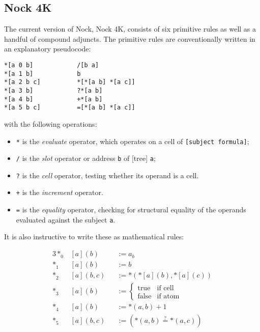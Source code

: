 \subsection{Nock 4K}

The current version of Nock, Nock 4K, consists of six primitive rules as well as a handful of compound adjuncts.  The primitive rules are conventionally written in an explanatory pseudocode:

\begin{lstlisting}[style=nonumbers]
*[a 0 b]            /[b a]
*[a 1 b]            b
*[a 2 b c]          *[*[a b] *[a c]]
*[a 3 b]            ?*[a b]
*[a 4 b]            +*[a b]
*[a 5 b c]          =[*[a b] *[a c]]
\end{lstlisting}

with the following operations:

\begin{itemize}
  \item  \texttt{*} is the \emph{evaluate} operator, which operates on a cell of \texttt{[subject formula]};
  \item  \texttt{/} is the \emph{slot} operator or address \texttt{b} of [tree] \texttt{a};
  \item  \texttt{?} is the \emph{cell} operator, testing whether its operand is a cell.
  \item  \texttt{+} is the \emph{increment} operator.
  \item  \texttt{=} is the \emph{equality} operator, checking for structural equality of the operands evaluated against the subject \texttt{a}.
\end{itemize}

It is also instructive to write these as mathematical rules:

\begin{alignat*}{3}
*_{0}&[a](b) &&:= a_{b} \\
*_{1}&[a](b) &&:= b \\
*_{2}&[a](b,c) &&:= *({*[a](b)}, {*[a](c)}) \\
*_{3}&[a](b) &&:= \left\{\begin{matrix} \textrm{true} & \text{if cell} \\ \textrm{false} & \text{if atom} \end{matrix} \right. \\
*_{4}&[a](b) &&:= {*(a,b) + 1} \\
*_{5}&[a](b,c) &&:= ({*(a,b)} \stackrel{?}{=} {*(a,c)})
\end{alignat*}

